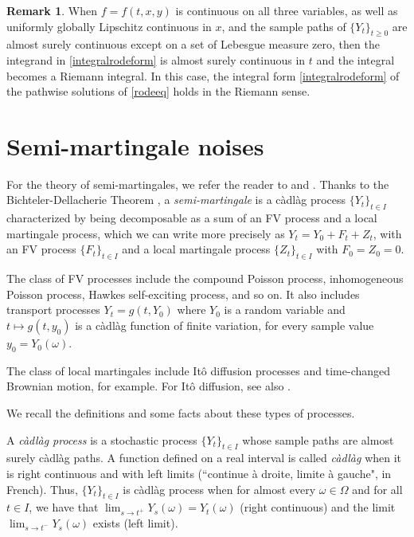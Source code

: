 \documentclass[reqno,12pt]{amsart}
\theoremstyle{plain} %
\theoremstyle{definition} %
\newtheorem{remark}{Remark}[section]
\begin{document}
\begin{remark}
    When $f=f(t, x, y)$ is continuous on all three variables, as well as uniformly globally Lipschitz continuous in $x$, and the sample paths of $\{Y_t\}_{t\geq 0}$ are almost surely continuous except on a set of Lebesgue measure zero, then the integrand in \eqref{integralrodeform} is almost surely continuous in $t$ and the integral becomes a Riemann integral. In this case, the integral form \eqref{integralrodeform} of the pathwise solutions of \eqref{rodeeq} holds in the Riemann sense.
\end{remark}

\section{Semi-martingale noises}

For the theory of semi-martingales, we refer the reader to \cite{Protter2005} and \cite{Metivier1982}. Thanks to the Bichteler-Dellacherie Theorem \cite[Theorem III.47]{Protter2005}, a \emph{semi-martingale} is a c\`adl\`ag process $\{Y_t\}_{t\in I}$ characterized by being decomposable as a sum of an FV process and a local martingale process, which we can write more precisely as $Y_t = Y_0 + F_t + Z_t$, with an FV process $\{F_t\}_{t\in I}$ and a local martingale process $\{Z_t\}_{t\in I}$ with $F_0 = Z_0 = 0.$

The class of FV processes include the compound Poisson process, inhomogeneous Poisson process, Hawkes self-exciting process, and so on. It also includes transport processes $Y_t = g(t, Y_0)$ where $Y_0$ is a random variable and $t \mapsto g(t, y_0)$ is a c\`adl\`ag function of finite variation, for every sample value $y_0=Y_0(\omega)$.

The class of local martingales include It\^o diffusion processes and time-changed Brownian motion, for example. For It\^o diffusion, see also \cite{Oksendal2003}.

We recall the definitions and some facts about these types of processes.

A \emph{c\`adl\`ag process} is a stochastic process $\{Y_t\}_{t\in I}$ whose sample paths are almost surely c\`adl\`ag paths. A function defined on a real interval is called \emph{c\`adl\`ag} when it is right continuous and with left limits (``continue \`a droite, limite \`a gauche", in French). Thus, $\{Y_t\}_{t\in I}$ is c\`adl\`ag process when for almost every $\omega\in \Omega$ and for all $t\in I$, we have that $\lim_{s\rightarrow t^+} Y_s(\omega) = Y_t(\omega)$ (right continuous) and the limit $\lim_{s \rightarrow t^-} Y_s(\omega)$ exists (left limit).
\end{document}
